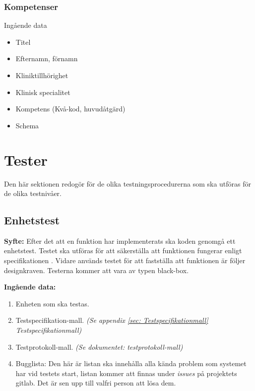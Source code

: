 \documentclass[a4paper,10pt, twoside]{article}
\begin{document}
\subsubsection{Kompetenser}
\label{sec: Kompetenser}
Ingående data
\begin{multicols}{2}
\begin{itemize}
	\item Titel
	\item Efternamn, förnamn
	\item Kliniktillhörighet
	\item Klinisk specialitet
	\item Kompetens (Kvå-kod, huvudåtgärd)
	\item Schema
\end{itemize}
\end{multicols}

\section{Tester}
Den här sektionen redogör för de olika testningsprocedurerna som ska utföras för de olika testnivåer.

\subsection{Enhetstest}
\label{sec:Enhetstest}
  \textbf{Syfte:} Efter det att en funktion har implementerats ska koden genomgå ett enhetstest. Testet ska utföras för att säkerställa att funktionen     	   fungerar enligt specifikationen \cite{kravspec}. Vidare används testet för att fastställa att funktionen är följer designkraven. Testerna kommer att 	   vara av typen black-box.

  \textbf{Ingående data:}
    \begin{enumerate}
      \item Enheten som ska testas.
      \item Testspecifikation-mall.
      \emph{(Se appendix \ref{sec: Testspecifikationmall} Testspecifikationmall)}
      \item Testprotokoll-mall. \emph{(Se dokumentet: testprotokoll-mall)}
      \item Bugglista: Den här är listan ska innehålla alla kända problem som
      systemet har vid testets start, listan kommer att finnas under
      \emph{issues} på projektets gitlab. Det är sen upp till valfri person att lösa dem.
    \end{enumerate}
\end{document}
